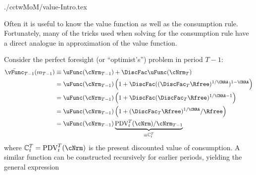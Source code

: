 \documentclass[titlepage, headings=optiontotocandhead]{\econtex}
\begin{document}
\begin{verbatimwrite}{./cctwMoM/value-Intro.tex}

  Often it is useful to know the value function as well as the consumption rule.  Fortunately, many of the tricks used when solving for the consumption rule have a direct analogue in approximation of the value function.

  Consider the perfect foresight (or ``optimist's'') problem in period $T-1$:
  \begin{equation*}\begin{gathered}\begin{aligned}
        \bar{\vFunc}_{T-1}({m}_{T-1})  & \equiv  \uFunc(\cNrm_{T-1})+\DiscFac \uFunc(\cNrm_{T})
        \\  & = \uFunc(\cNrm_{T-1})\left(1+\DiscFac ((\DiscFac_{T}\Rfree)^{1/\CRRA})^{1-\CRRA}\right)
        \\  & = \uFunc(\cNrm_{T-1})\left(1+\DiscFac (\DiscFac_{T}\Rfree)^{1/\CRRA-1}\right)
        \\  & = \uFunc(\cNrm_{T-1})\left(1+(\DiscFac_{T}\Rfree)^{1/\CRRA}/\Rfree\right)
        \\  & = \uFunc(\cNrm_{T-1})\underbrace{\mbox{PDV}_{t}^{T}(\cNrm)/\cNrm_{T-1}}_{\equiv \mathbb{C}_{t}^{T}}
      \end{aligned}\end{gathered}\end{equation*}
  where $\mathbb{C}_{t}^{T}=\mbox{PDV}_{t}^{T}(\cNrm)$ is the present discounted value of consumption.
  A similar function can be constructed recursively for earlier periods, yielding
  the general expression \hypertarget{vFuncPF}{}
\end{verbatimwrite}
\unskip
\end{document}
